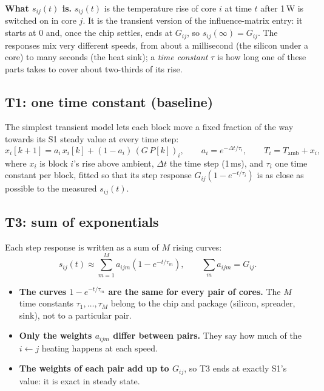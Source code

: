 \documentclass[11pt,a4paper]{article}
\begin{document}
\textbf{What $s_{ij}(t)$ is.} $s_{ij}(t)$ is the temperature rise of core $i$ at time $t$ after
1\,W is switched on in core $j$. It is the transient version of the influence-matrix entry: it
starts at 0 and, once the chip settles, ends at $G_{ij}$, so $s_{ij}(\infty) = G_{ij}$. The
responses mix very different speeds, from about a millisecond (the silicon under a core) to many
seconds (the heat sink); a \emph{time constant} $\tau$ is how long one of these parts takes to cover
about two-thirds of its rise.

\subsection{T1: one time constant (baseline)}
The simplest transient model lets each block move a fixed fraction of the way towards its S1
steady value at every time step:
\begin{equation}
  x_i[k+1] = a_i\, x_i[k] + (1 - a_i)\,(G\,P[k])_i, \qquad a_i = e^{-\Delta t/\tau_i},
  \qquad T_i = T_\text{amb} + x_i,
  \label{eq:t1}
\end{equation}
where $x_i$ is block $i$'s rise above ambient, $\Delta t$ the time step (1\,ms), and $\tau_i$ one
time constant per block, fitted so that its step response $G_{ij}(1 - e^{-t/\tau_i})$ is as close
as possible to the measured $s_{ij}(t)$.

\subsection{T3: sum of exponentials}
Each step response is written as a sum of $M$ rising curves:
\begin{equation}
  s_{ij}(t) \approx \sum_{m=1}^{M} a_{ijm}\left(1 - e^{-t/\tau_m}\right),
  \qquad \sum_m a_{ijm} = G_{ij}.
  \label{eq:t3}
\end{equation}
\begin{itemize}
  \item \textbf{The curves $1 - e^{-t/\tau_m}$ are the same for every pair of cores.} The $M$ time
        constants $\tau_1, \dots, \tau_M$ belong to the chip and package (silicon, spreader, sink),
        not to a particular pair.
  \item \textbf{Only the weights $a_{ijm}$ differ between pairs.} They say how much of the
        $i \leftarrow j$ heating happens at each speed.
  \item \textbf{The weights of each pair add up to $G_{ij}$}, so T3 ends at exactly S1's value:
        it is exact in steady state.
\end{itemize}
\end{document}
